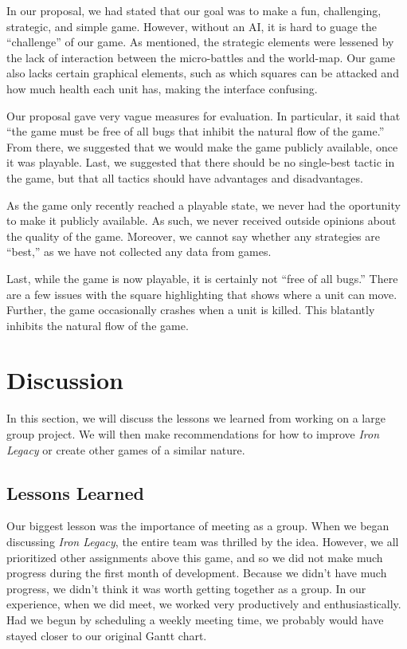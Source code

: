 \documentclass{article}
\begin{document}
In our proposal, we had stated that our goal was to make a fun, challenging,
    strategic, and simple game.
    However, without an AI, it is hard to guage the ``challenge'' of our game.
    As mentioned, the strategic elements were lessened by the lack of
    interaction between the micro-battles and the world-map.
    Our game also lacks certain graphical elements, such as which squares
    can be attacked and how much health each unit has, making the interface
    confusing.

Our proposal gave very vague measures for evaluation.
    In particular, it said that ``the game must be free of all bugs that
    inhibit the natural flow of the game.''
    From there, we suggested that we would make the game publicly available,
    once it was playable.
    Last, we suggested that there should be no single-best tactic in the game,
    but that all tactics should have advantages and disadvantages.

As the game only recently reached a playable state,
    we never had the oportunity to make it publicly available.
    As such, we never received outside opinions about the quality of the game.
    Moreover, we cannot say whether any strategies are ``best,''
    as we have not collected any data from games.

Last, while the game is now playable, it is certainly not ``free of all bugs.''
    There are a few issues with the square highlighting that shows
    where a unit can move.
    Further, the game occasionally crashes when a unit is killed.
    This blatantly inhibits the natural flow of the game.

\section*{Discussion}

In this section, we will discuss the lessons we learned from working 
    on a large group project.
    We will then make recommendations for how to improve \emph{Iron Legacy}
    or create other games of a similar nature.

\subsection*{Lessons Learned}

Our biggest lesson was the importance of meeting as a group.
    When we began discussing \emph{Iron Legacy}, the entire team was thrilled
    by the idea.
    However, we all prioritized other assignments above this game,
    and so we did not make much progress during the first month of development.
    Because we didn't have much progress, we didn't think it was worth
    getting together as a group.
    In our experience, when we did meet, we worked very productively
    and enthusiastically.
    Had we begun by scheduling a weekly meeting time,
    we probably would have stayed closer to our original Gantt chart.
\end{document}
